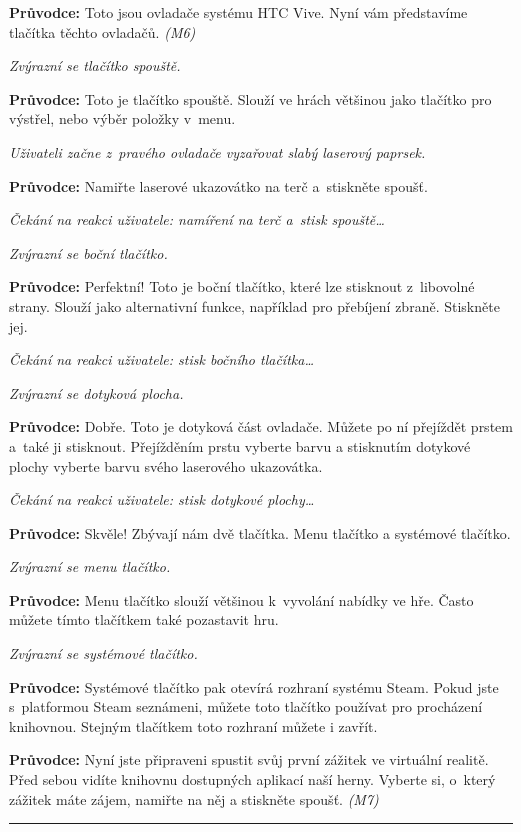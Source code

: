 \textbf{Průvodce:} Toto jsou ovladače systému HTC Vive. Nyní vám
představíme tlačítka těchto ovladačů. \emph{(M6)}

\emph{Zvýrazní se tlačítko spouště.}

\textbf{Průvodce:} Toto je tlačítko spouště. Slouží ve hrách většinou
jako tlačítko pro výstřel, nebo výběr položky v~menu.

\emph{Uživateli začne z~pravého ovladače vyzařovat slabý laserový
paprsek.}

\textbf{Průvodce:} Namiřte laserové ukazovátko na terč a~stiskněte
spoušť.

\emph{Čekání na reakci uživatele: namíření na terč a~stisk
spouště\ldots{}}

\emph{Zvýrazní se boční tlačítko.}

\textbf{Průvodce:} Perfektní! Toto je boční tlačítko, které lze
stisknout z~libovolné strany. Slouží jako alternativní funkce, například
pro přebíjení zbraně. Stiskněte jej.

\emph{Čekání na reakci uživatele: stisk bočního tlačítka\ldots{}}

\emph{Zvýrazní se dotyková plocha.}

\textbf{Průvodce:} Dobře. Toto je dotyková část ovladače. Můžete po ní
přejíždět prstem a~také ji stisknout. Přejížděním prstu vyberte barvu a
stisknutím dotykové plochy vyberte barvu svého laserového ukazovátka.

\emph{Čekání na reakci uživatele: stisk dotykové plochy\ldots{}}

\textbf{Průvodce:} Skvěle! Zbývají nám dvě tlačítka. Menu tlačítko a
systémové tlačítko.

\emph{Zvýrazní se menu tlačítko.}

\textbf{Průvodce:} Menu tlačítko slouží většinou k~vyvolání nabídky ve
hře. Často můžete tímto tlačítkem také pozastavit hru.

\emph{Zvýrazní se systémové tlačítko.}

\textbf{Průvodce:} Systémové tlačítko pak otevírá rozhraní systému
Steam. Pokud jste s~platformou Steam seznámeni, můžete toto tlačítko
používat pro procházení knihovnou. Stejným tlačítkem toto rozhraní
můžete i zavřít.

\textbf{Průvodce:} Nyní jste připraveni spustit svůj první zážitek ve
virtuální realitě. Před sebou vidíte knihovnu dostupných aplikací naší
herny. Vyberte si, o~který zážitek máte zájem, namiřte na něj a
stiskněte spoušť. \emph{(M7)}

\begin{center}\rule{0.5\linewidth}{\linethickness}\end{center}

